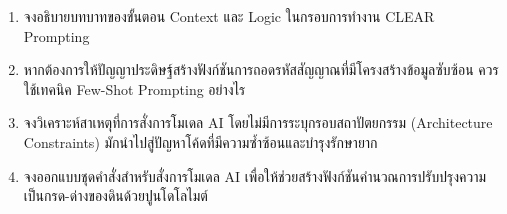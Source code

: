 \begin{enumerate}
    \item จงอธิบายบทบาทของขั้นตอน Context และ Logic ในกรอบการทำงาน CLEAR Prompting
    \item หากต้องการให้ปัญญาประดิษฐ์สร้างฟังก์ชันการถอดรหัสสัญญาณที่มีโครงสร้างข้อมูลซับซ้อน ควรใช้เทคนิค Few-Shot Prompting อย่างไร
    \item จงวิเคราะห์สาเหตุที่การสั่งการโมเดล AI โดยไม่มีการระบุกรอบสถาปัตยกรรม (Architecture Constraints) มักนำไปสู่ปัญหาโค้ดที่มีความซ้ำซ้อนและบำรุงรักษายาก
    \item จงออกแบบชุดคำสั่งสำหรับสั่งการโมเดล AI เพื่อให้ช่วยสร้างฟังก์ชันคำนวณการปรับปรุงความเป็นกรด-ด่างของดินด้วยปูนโดโลไมต์
\end{enumerate}
